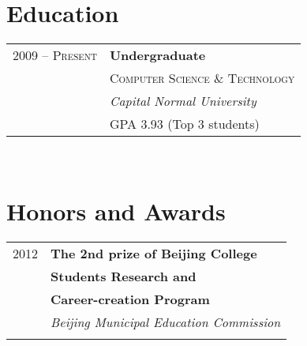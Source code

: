 \documentclass[10pt]{article} %
\begin{document}
\begin{minipage}[t]{0.44\textwidth} 
\vspace{0pt} %


\section{Education} 

\begin{tabular}{rl} %


2009 -- \textsc{Present} & \textbf{Undergraduate} \\ 
& \textsc{Computer Science \& Technology} \\ 
& \textit{Capital Normal University}\\
& GPA 3.93 (Top 3 students)\\
	

\end{tabular}\\[0pt]


\section{Honors and Awards} 

\begin{tabular}{rl}

2012	 & \small\textbf{The 2nd prize of Beijing College }\\
& \small\textbf{ Students Research and }\\
& \small\textbf{ Career-creation Program}\\
& \small\textit{Beijing Municipal Education Commission}\\ \\


\end{tabular}
\end{minipage}
\end{document}
